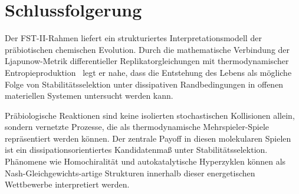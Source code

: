 \documentclass[12pt,a4paper]{article}
\theoremstyle{remark}
\begin{document}
\section{Schlussfolgerung}
\label{sec:conclusion}

Der FST-II-Rahmen liefert ein strukturiertes Interpretationsmodell der präbiotischen chemischen Evolution. Durch die mathematische Verbindung der Ljapunow-Metrik differentieller Replikatorgleichungen mit thermodynamischer Entropieproduktion~\citep{ReplicatorEntropy} legt er nahe, dass die Entstehung des Lebens als mögliche Folge von Stabilitätsselektion unter dissipativen Randbedingungen in offenen materiellen Systemen untersucht werden kann.

Präbiologische Reaktionen sind keine isolierten stochastischen Kollisionen allein, sondern vernetzte Prozesse, die als thermodynamische Mehrspieler-Spiele repräsentiert werden können. Der zentrale \glqq Payoff\grqq{} in diesen molekularen Spielen ist ein dissipationsorientiertes Kandidatenmaß unter Stabilitätsselektion. Phänomene wie Homochiralität und autokatalytische Hyperzyklen können als Nash-Gleichgewichts-artige Strukturen innerhalb dieser energetischen Wettbewerbe interpretiert werden.
\end{document}
